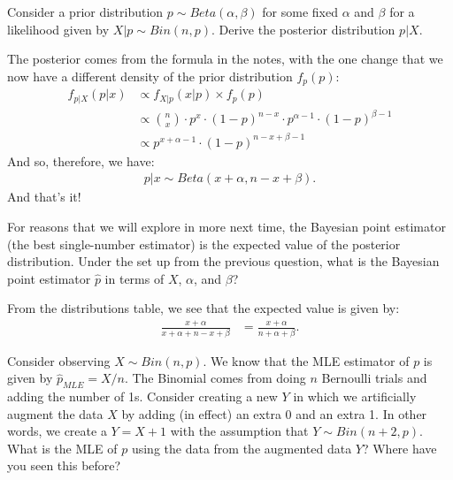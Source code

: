 
Consider a prior distribution $p \sim Beta(\alpha, \beta)$ for some fixed
$\alpha$ and $\beta$ for a likelihood given by $X|p \sim Bin(n, p)$. Derive
the posterior distribution $p|X$.


The posterior comes from the formula in the notes, with the one change that
we now have a different density of the prior distribution $f_{p}(p)$:
\begin{align*}
f_{p|X}(p|x) &\propto f_{X|p}(x|p) \times f_{p}(p) \\
&\propto \binom{n}{x} \cdot p^{x} \cdot (1 - p)^{n-x} \cdot p^{\alpha - 1} \cdot (1 - p)^{\beta - 1} \\
&\propto p^{x + \alpha - 1} \cdot (1 - p)^{n - x + \beta - 1}
\end{align*}
And so, therefore, we have:
\begin{align*}
p|x \sim Beta(x + \alpha, n - x + \beta).
\end{align*}
And that's it!


For reasons that we will explore in more next time, the Bayesian point estimator
(the best single-number estimator) is the expected value of the posterior
distribution. Under the set up from the previous question, what is the Bayesian
point estimator $\widehat{p}$ in terms of $X$, $\alpha$, and $\beta$?


From the distributions table, we see that the expected value is given by:
\begin{align*}
\frac{x + \alpha}{x + \alpha + n - x + \beta} &= \frac{x + \alpha}{n + \alpha + \beta}.
\end{align*}


Consider observing $X \sim Bin(n, p)$. We know that the MLE estimator of $p$ is
given by $\hat{p}_{MLE} = X / n$. The Binomial comes from doing $n$ Bernoulli
trials and adding the number of 1s. Consider creating a new $Y$ in which we 
artificially augment the data $X$ by adding (in effect) an extra 0 and an extra
1. In other words, we create a $Y = X + 1$ with the assumption that
$Y \sim Bin(n+2, p)$. What is the MLE of $p$ using the data from the augmented
data $Y$? Where have you seen this before?

